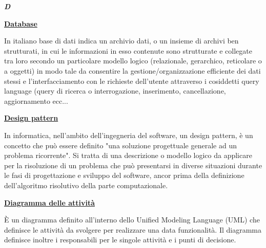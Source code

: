 \newpage

\cleardoublepage
{}
{}
\noindent\hrulefill\hspace{4mm}\textbf{\textsl{\Huge{D}}}\hspace{4mm}\hrulefill

\vspace*{2\bigskipamount}

\begin{addmargin}[0em]{0em}	
	\textbf{\underline{Database}}
\end{addmargin}

\medskip
\begin{addmargin}[5em]{1em}	
In italiano base di dati indica un archivio dati, o un insieme di archivi ben strutturati, in cui le informazioni in esso contenute sono strutturate e collegate tra loro secondo un particolare modello logico (relazionale, gerarchico, reticolare o a oggetti) in modo tale da consentire la gestione/organizzazione efficiente dei dati stessi e l'interfacciamento con le richieste dell'utente attraverso i cosiddetti query language (query di ricerca o interrogazione, inserimento, cancellazione, aggiornamento ecc...
\end{addmargin}	

\bigskip
\begin{addmargin}[0em]{0em}	
	\textbf{\underline{Design pattern}}
\end{addmargin}

\medskip
\begin{addmargin}[5em]{1em}	
In informatica, nell'ambito dell'ingegneria del software, un design pattern, è un concetto che può essere definito "una soluzione progettuale generale ad un problema ricorrente". Si tratta di una descrizione o modello logico da applicare per la risoluzione di un problema che può presentarsi in diverse situazioni durante le fasi di progettazione e sviluppo del software, ancor prima della definizione dell'algoritmo risolutivo della parte computazionale.
\end{addmargin}	

\bigskip
\begin{addmargin}[0em]{0em}	
	\textbf{\underline{Diagramma delle attività}}
\end{addmargin}
	
\medskip
\begin{addmargin}[5em]{1em}	
È un diagramma definito all'interno dello Unified Modeling Language (UML) che definisce le attività da svolgere per realizzare una data funzionalità. Il diagramma definisce inoltre i responsabili per le singole attività e i punti di decisione. 
\end{addmargin}	

